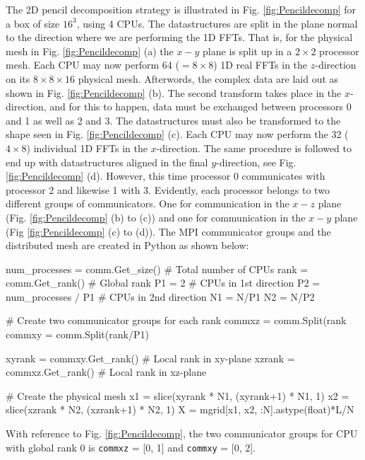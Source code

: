 \documentclass[11pt, oneside]{article}
\newcommand{\inpyth}{\lstinline[style=pythonstyle, basicstyle=\ttfamily]} %[]%
\begin{document}
The 2D pencil decomposition strategy is illustrated in Fig. \ref{fig:Pencildecomp} for a box of size $16^3$, using 4 CPUs. The datastructures are split in the plane normal to the direction where we are performing the 1D FFTs. That is, for the physical mesh in Fig. \ref{fig:Pencildecomp} (a) the $x-y$ plane is split up in a $2\times2$ processor mesh. Each CPU may now perform 64 ($= 8 \times 8$) 1D real FFTs in the $z$-direction on its $8 \times 8 \times 16$ physical mesh. Afterwords, the complex data are laid out as shown in Fig. \ref{fig:Pencildecomp} (b). The second transform takes place in the $x$-direction, and for this to happen, data must be exchanged between processors 0 and 1 as well as 2 and 3. The datastructures must also be transformed to the shape seen in Fig. \ref{fig:Pencildecomp} (c). Each CPU may now perform the 32 ($4 \times 8$) individual 1D FFTs in the $x$-direction. The same procedure is followed to end up with datastructures aligned in the final $y$-direction, see Fig. \ref{fig:Pencildecomp} (d). However, this time processor 0 communicates with processor 2 and likewise 1 with 3. Evidently, each processor belongs to two different groups of communicators. One for communication in the $x-z$ plane (Fig. \ref{fig:Pencildecomp} (b) to (c)) and one for communication in the $x-y$ plane (Fig \ref{fig:Pencildecomp} (c) to (d)). The MPI communicator groups and the distributed mesh are created in Python as shown below:


\begin{python}
num_processes = comm.Get_size()  # Total number of CPUs
rank = comm.Get_rank()           # Global rank
P1 = 2                           # CPUs in 1st direction
P2 = num_processes / P1          # CPUs in 2nd direction
N1 = N/P1
N2 = N/P2

# Create two communicator groups for each rank
commxz = comm.Split(rank%
commxy = comm.Split(rank/P1)

xyrank = commxy.Get_rank() # Local rank in xy-plane
xzrank = commxz.Get_rank() # Local rank in xz-plane

# Create the physical mesh
x1 = slice(xyrank * N1, (xyrank+1) * N1, 1)
x2 = slice(xzrank * N2, (xzrank+1) * N2, 1)
X = mgrid[x1, x2, :N].astype(float)*L/N
\end{python}
With reference to Fig. \ref{fig:Pencildecomp}, the two communicator groups for CPU with global rank 0 is \inpyth{commxz} = [0, 1] and \inpyth{commxy} = [0, 2].
\end{document}
